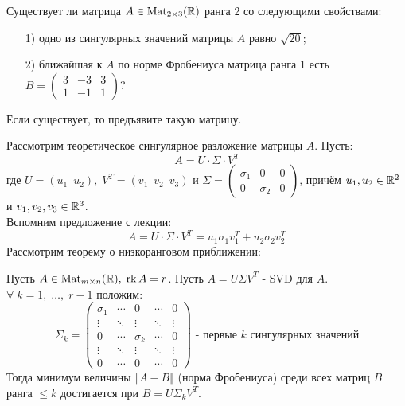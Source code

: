 \begin{condition}
    Существует ли матрица $A \in \operatorname{Mat}_{2 \times 3}(\mathbb{R})$ ранга 2 со следующими свойствами:
    \begin{enumerate}
        \item[1)] одно из сингулярных значений матрицы $A$ равно $\sqrt{20}$;

        \item[2)] ближайшая к $A$ по норме Фробениуса матрица ранга $1$ есть
            $
                B =
                \begin{pmatrix}
                    3 & -3 & 3 \\
                    1 & -1 & 1
                \end{pmatrix}
            $?
    \end{enumerate}
    Если существует, то предъявите такую матрицу.
\end{condition}

Рассмотрим теоретическое сингулярное разложение матрицы $A$. Пусть:
\[
    A = U \cdot \Sigma \cdot V^T
\]
где $U = (u_1 \ \; u_2),\; V^T = (v_1 \ \; v_2 \ \; v_3)$ и $\Sigma =
    \begin{pmatrix}
        \sigma_1 & 0        & 0 \\
        0        & \sigma_2 & 0
    \end{pmatrix}$, причём $u_1, u_2 \in \mathbb{R}^2$ и $v_1, v_2, v_3 \in \mathbb{R}^3$.
\\[5mm]
Вспомним предложение с лекции:
\[
    A = U \cdot \Sigma \cdot V^T = u_1 \sigma_1 v_1^T + u_2 \sigma_2 v_2^T
\]
Рассмотрим теорему о низкоранговом приближении:
\begin{theorem}
    Пусть $A \in \operatorname{Mat}_{m \times n}(\mathbb{R}), \; \operatorname{rk} A = r$. Пусть $A = U \Sigma V^T$ - SVD для $A$. $\forall \; k = 1, \; \ldots, \; r - 1 $ положим:
    \[
        \Sigma_k =
        \begin{pmatrix}
            \sigma_1 & \cdots & 0        & \cdots & 0      \\
            \vdots   & \ddots & \vdots   & \ddots & \vdots \\
            0        & \cdots & \sigma_k & \cdots & 0      \\
            \vdots   & \ddots & \vdots   & \ddots & \vdots \\
            0        & \cdots & 0        & \cdots & 0
        \end{pmatrix}
        \text{ - первые $k$ сингулярных значений}
    \]
    Тогда минимум величины $\Vert A - B \Vert$ (норма Фробениуса) среди всех матриц $B$ ранга $\leq k$ достигается при $B = U \Sigma_k V^T$.
\end{theorem}

